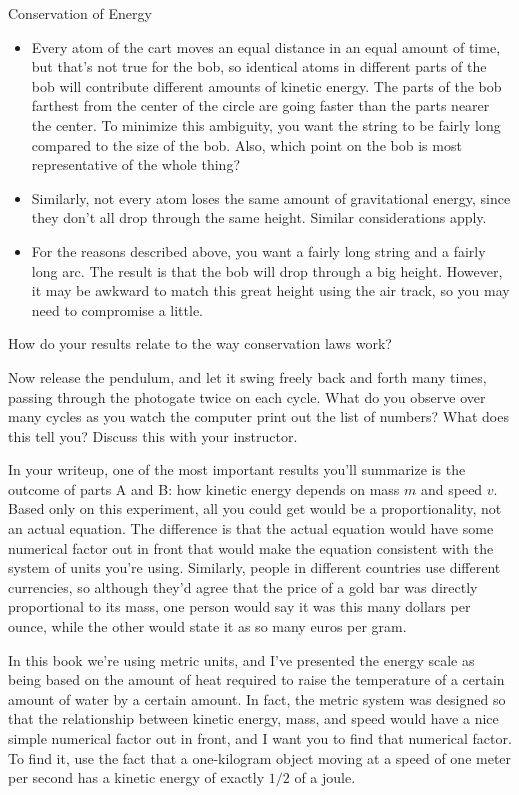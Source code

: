 \begin{lab}{Conservation of Energy}
\begin{itemize}
\item[] Every atom of the cart moves an equal distance in an equal amount of
time, but that's not true for the bob, so identical atoms in different parts of
the bob will contribute different amounts of kinetic energy. The parts of the bob farthest from the
center of the circle are going faster than the parts nearer the center. To minimize
this ambiguity, you want the string to be fairly long compared to the size of
the bob. Also, which point on the bob is most representative of the whole thing?

\item[] Similarly, not every atom loses the same amount of gravitational energy,
since they don't all drop through the same height. Similar considerations apply.

\item[] For the reasons described above, you want a fairly long string and a fairly
long arc. The result is that the bob will drop through a big height. However, it may be
awkward to match this great height using the air track, so you may need to compromise
a little.

\end{itemize}

\enlargethispage{-\baselineskip}

How do your results relate to the way conservation laws work?

Now release the pendulum, and let it swing freely back and forth many times,
passing through the photogate twice on each cycle. What do you observe over
many cycles as you watch the computer print out the list of numbers? What
does this tell you? Discuss this with your instructor.

In your writeup, one of the most important results you'll summarize is
the outcome of parts A and B: how kinetic energy depends on mass $m$ and speed $v$.
Based only on this experiment, all you could get would be a proportionality, not an
actual equation. The difference is that the actual equation would have some numerical
factor out in front that would make the equation consistent with the system of units
you're using. Similarly, people in different countries use different currencies, so
although they'd agree that the price of a gold bar was directly proportional to its
mass, one person would say it was this many dollars per ounce, while the other would
state it as so many euros per gram.

In this book we're using metric units, and I've presented the energy scale as being
based on the amount of heat required to raise the temperature of a certain amount of
water by a certain amount. In fact, the metric system was designed so that the relationship
between kinetic energy, mass, and speed would have a nice simple numerical factor out
in front, and I want you to find that numerical factor. To find it, use the fact that
a one-kilogram object moving at a speed of one meter per second has a kinetic energy
of exactly $1/2$ of a joule.

\end{lab}

